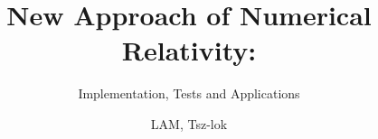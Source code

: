 \title{New Approach of Numerical Relativity:}

\subtitle{Implementation, Tests and Applications}

\author{LAM, Tsz-lok}









     



\renewcommand{\submissiontext}{A Thesis Submitted in Partial Fulfilment \\ of the Reqirements for the Degree of}

